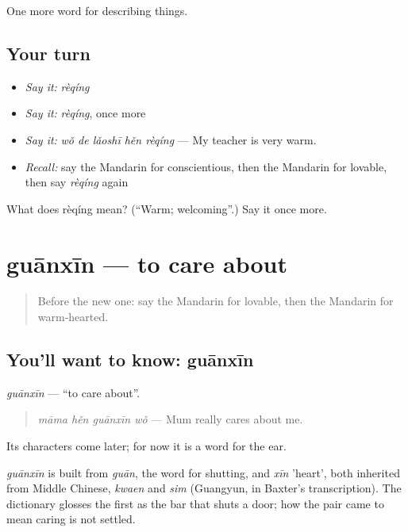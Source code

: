 \begin{grammarlens}[title={What you've built}]
One more word for describing things.
\end{grammarlens}

\subsection*{Your turn}
\begin{itemize}
\raggedright
  \item \emph{Say it:} \emph{rèqíng}
  \item \emph{Say it:} \emph{rèqíng}, once more
  \item \emph{Say it:} \emph{wǒ de lǎoshī hěn rèqíng} — My teacher is very warm.
  \item \emph{Recall:} say the Mandarin for conscientious, then the Mandarin for lovable, then say \emph{rèqíng} again
\end{itemize}

\begin{tcolorbox}[breakable,colback=teal!4,colframe=teal!35!black,title={Before you move on}]
What does rèqíng mean? (\textquotedblleft{}Warm; welcoming\textquotedblright{}.) Say it once more.
\end{tcolorbox}
\section[guānxīn]{guānxīn — to care about}

\label{lesson:ZH-C123-guanxin}



\begin{quote}
Before the new one: say the Mandarin for lovable, then the Mandarin for warm-hearted.
\end{quote}

\subsection*{You'll want to know: guānxīn}
\emph{guānxīn} — \textquotedblleft{}to care about\textquotedblright{}.

\begin{quote}
\emph{māma hěn guānxīn wǒ} — Mum really cares about me.
\end{quote}

Its characters come later; for now it is a word for the ear.

\begin{cousinweb}
\emph{guānxīn} is built from \emph{guān}, the word for shutting, and \emph{xīn} 'heart', both inherited from Middle Chinese, \emph{kwaen} and \emph{sim} (Guangyun, in Baxter's transcription). The dictionary glosses the first as the bar that shuts a door; how the pair came to mean caring is not settled.
\end{cousinweb}

